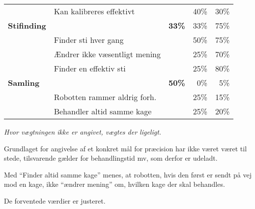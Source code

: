 \begin{footnotesize}
\begin{center}
\begin{tabular}{l | l | r r r}
	& Kan kalibreres effektivt & & 40\% & 30\% \\
	\hspace*{0.3cm}\hspace*{0.3cm} \textbf{Stifinding}
																&		&	\textbf{33\%} & 	33\% & 75\% \\
	& Finder sti hver gang & & 50\% & 75\% \\
	& Ændrer ikke væsentligt mening & & 25\% & 70\% \\
	& Finder en effektiv sti & & 25\% & 80\% \\
	\hspace*{0.3cm} \textbf{Samling}
																&		&\textbf{50\%}		& 	0\%	& 5\% \\
	& Robotten rammer aldrig forh. & & 25\% & 15\% \\
	& Behandler altid samme kage & & 25\% & 20\%
\end{tabular}
\end{center}
\end{footnotesize}
\textit{Hvor vægtningen ikke er angivet, vægtes der ligeligt.}

Grundlaget for angivelse af et konkret mål for præcision har ikke været  været til stede, tilsvarende gælder for behandlingstid mv, som derfor er udeladt.

Med "`Finder altid samme kage"' menes, at robotten, hvis den først er sendt på vej mod en kage, ikke "`ændrer mening"' om, hvilken kage der skal behandles.

De forventede værdier er justeret.